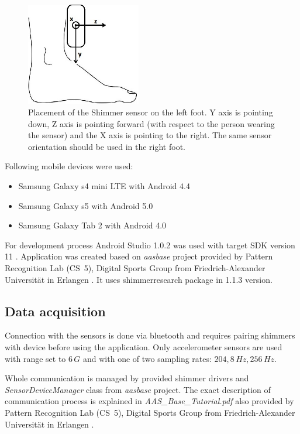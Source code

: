 \documentclass[conference]{IEEEtran}
\begin{document}
\begin{figure}[!h]
    \centering
    \includegraphics[width=5cm]{Images/Foot.jpg}
    \caption{Placement of the Shimmer sensor on the left foot.
    Y axis is pointing down, Z axis is pointing forward (with respect to the person wearing the sensor) and the X axis is pointing to the right. The same sensor orientation should be used in the right foot.}
    \label{fig:ShimmerPlacement}
\end{figure}

Following mobile devices were used:
\begin{itemize}
    \item Samsung Galaxy s4 mini LTE with Android 4.4
    \item Samsung Galaxy s5 with Android 5.0
    \item Samsung Galaxy Tab 2 with Android 4.0
\end{itemize}

For development process Android Studio 1.0.2 was used with target SDK version 11 \cite{AndroidStudio}. 
Application was created based on \emph{aasbase} project provided by Pattern Recognition Lab (CS~5), Digital Sports Group from Friedrich-Alexander Universität in Erlangen \cite{CS5}.
It uses shimmerresearch package in 1.1.3 version.


\subsection{Data acquisition}
Connection with the sensors is done via bluetooth and requires pairing shimmers with device before using the application.
Only accelerometer sensors are used with range set to $6\,G$ and with one of two sampling rates: $204,8\,Hz, 256\,Hz$.

Whole communication is managed by provided shimmer drivers and \emph{SensorDeviceManager} class from \emph{aasbase} project. The exact description of communication process is explained in \emph{AAS\_Base\_Tutorial.pdf} also provided by Pattern Recognition Lab (CS~5), Digital Sports Group from Friedrich-Alexander Universität in Erlangen \cite{CS5}.
\end{document}
